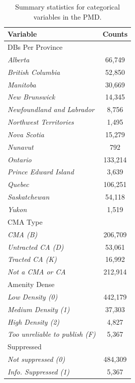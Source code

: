 \documentclass[11pt, a4paper]{article}
\begin{document}
\begin{longtable}[H]{|l|c|}
\caption[Summary of cateogrical variables]{Summary statistics for categorical variables in the PMD.}\label{categorical}
\endfirsthead
\endhead
\hline
\textbf{Variable}  & \textbf{Counts}  \\
\hline
{DBs Per Province} &  \\
\indent\indent \textit{Alberta} & 66,749 \\
\indent\indent \textit{British Columbia} & 52,850 \\
\indent\indent \textit{Manitoba} & 30,669 \\
\indent\indent \textit{New Brunswick} & 14,345 \\
\indent\indent \textit{Newfoundland and Labrador} & 8,756 \\
\indent\indent \textit{Northwest Territories} & 1,495 \\
\indent\indent \textit{Nova Scotia} & 15,279 \\
\indent\indent \textit{Nunavut} & 792 \\
\indent\indent \textit{Ontario} & 133,214 \\
\indent\indent \textit{Prince Edward Island} & 3,639 \\
\indent\indent \textit{Quebec} &  106,251 \\
\indent\indent \textit{Saskatchewan} & 54,118 \\
\indent\indent \textit{Yukon} & 1,519 \\
\hline

{CMA Type} &  \\
\indent\indent \textit{CMA (B)} & 206,709 \\
\indent\indent \textit{Untracted CA (D)} & 53,061 \\
\indent\indent \textit{Tracted CA (K)} & 16,992 \\
\indent\indent \textit{Not a CMA or CA} & 212,914 \\
\hline

{Amenity Dense} &  \\
\indent\indent \textit{Low Density (0)} & 442,179 \\
\indent\indent \textit{Medium Density (1)} & 37,303 \\
\indent\indent \textit{High Density (2)} & 4,827 \\
\indent\indent \textit{Too unreliable to publish (F)} & 5,367 \\
\hline

{Suppressed} &  \\
\indent\indent \textit{Not suppressed (0)} & 484,309 \\
\indent\indent \textit{Info. Suppressed (1)} & 5,367 \\
\hline
\end{longtable}
\end{document}
